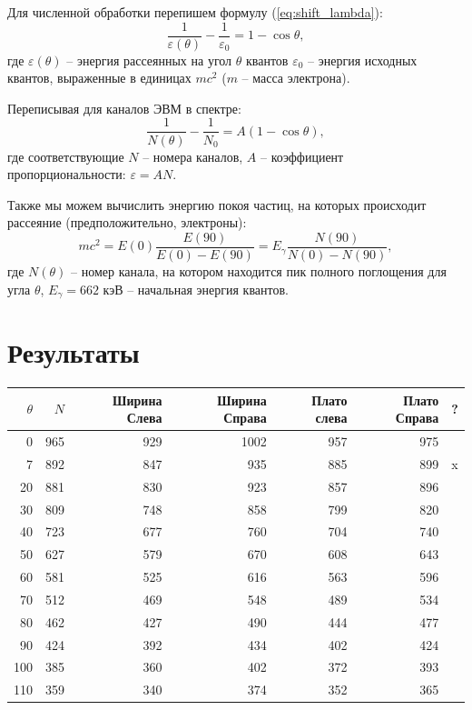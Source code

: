 \documentclass[12pt,a4paper]{article}
\begin{document}
	Для численной обработки перепишем формулу (\ref{eq:shift_lambda}):
	\begin{equation*}
		\frac{1}{\varepsilon(\theta)} - \frac{1}{\varepsilon_0} = 1 - \cos \theta,
		\label{eq:shift_epsilon}
	\end{equation*}
	где $\varepsilon(\theta)$ -- энергия рассеянных на угол $\theta$ квантов $\varepsilon_0$ -- энергия исходных квантов, выраженные в единицах $mc^2$ ($m$ -- масса электрона).
	
	Переписывая для каналов ЭВМ в спектре:
	\begin{equation}
		\frac{1}{N(\theta)} - \frac{1}{N_0} = A (1 - \cos \theta),
		\label{eq:shift_n}
	\end{equation}
	где соответствующие $N$ -- номера каналов, $A$ -- коэффициент пропорциональности: $\varepsilon = A N$.
	
	Также мы можем вычислить энергию покоя частиц, на которых происходит рассеяние (предположительно, электроны):
	\begin{equation}
		mc^2 = E(0) \frac{E(90)}{E(0) - E(90)} = E_{\gamma} \frac{N(90)}{N(0) - N(90)},
	\end{equation}
	где $N(\theta)$ -- номер канала, на котором находится пик полного поглощения для угла $\theta$, $E_{\gamma} = 662$ кэВ -- начальная энергия квантов.

	\section*{Результаты}

        \begin{center}
        \begin{tabular}{rrrrrrl}
        \(\theta\) & \(N\) & Ширина Слева & Ширина Справа & Плато слева & Плато Справа & ?\\[0pt]
        \hline
        0 & 965 & 929 & 1002 & 957 & 975 & \\[0pt]
        7 & 892 & 847 & 935 & 885 & 899 & x\\[0pt]
        20 & 881 & 830 & 923 & 857 & 896 & \\[0pt]
        30 & 809 & 748 & 858 & 799 & 820 & \\[0pt]
        40 & 723 & 677 & 760 & 704 & 740 & \\[0pt]
        50 & 627 & 579 & 670 & 608 & 643 & \\[0pt]
        60 & 581 & 525 & 616 & 563 & 596 & \\[0pt]
        70 & 512 & 469 & 548 & 489 & 534 & \\[0pt]
        80 & 462 & 427 & 490 & 444 & 477 & \\[0pt]
        90 & 424 & 392 & 434 & 402 & 424 & \\[0pt]
        100 & 385 & 360 & 402 & 372 & 393 & \\[0pt]
        110 & 359 & 340 & 374 & 352 & 365 & \\[0pt]
        \end{tabular}
        \end{center}
\end{document}
